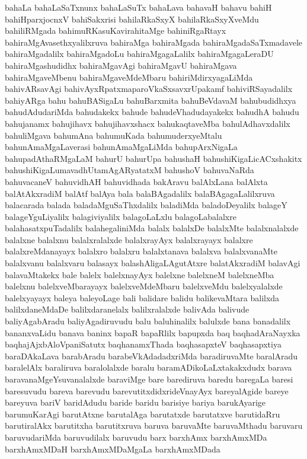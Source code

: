 {bahaLa
bahaLaSaTxnunx
bahaLaSuTx
bahaLava
bahavaH
bahavu
bahiH
bahiHparxjocnxV
bahiSakxrisi
bahilaRkaSxyX
bahilaRkaSxyXveMdu
bahiliRMgada
bahimuRKasuKavirahitaMge
bahiniRgaRtayx
bahiraMgAvasethxyalilxruva
bahiraMga
bahiraMgada
bahiraMgadaSaTxmadavele
bahiraMgadalilx
bahiraMgadoLu
bahiraMgagaLalilx
bahiraMgagaLeraDU
bahiraMgashudidhx
bahiraMgavAgi
bahiraMgavU
bahiraMgava
bahiraMgaveMbenu
bahiraMgaveMdeMbaru
bahiriMdirxyagaLiMda
bahivARsavAgi
bahivAyxRpatxmaparoVkaSxsavxrUpakamf
bahiviRSayadalilx
bahiyARga
bahu
bahuBASigaLu
bahuBarxmita
bahuBeVdavaM
bahubudidhxya
bahudAdudariMda
bahudakekx
bahude
bahudeVhadudayakekx
bahudhA
bahudu
bahujanamx
bahujihavx
bahujihavxshacx
bahukaqtaveMba
bahulAdhavxdalilx
bahuliMgava
bahumAna
bahumuKada
bahumuderxyeMtalu
bahunAmaMgaLaverasi
bahunAmaMgaLiMda
bahupArxNigaLa
bahupadAthaRMgaLaM
bahurU
bahurUpa
bahushaH
bahushiKigaLicACxshakitx
bahushiKigaLumavadhUtamAgARyatatxM
bahushoV
bahuvaNaRda
bahuvacaneV
bahuvidhAH
bahuvidhada
bakAravu
balAlxLana
balAlxta
balAtAkxradiM
balAtf
balAya
bala
balaBAgadalilx
balaBAgagaLalilxruva
balacarada
balada
baladaMguSaThxdalilx
baladiMda
baladoDeyalilx
balageY
balageYguLiyalilx
balagiviyalilx
balagoLaLxlu
balagoLabalalxre
balahasatxpuTadalilx
balahegaliniMda
balalx
balalxDe
balalxMte
balalxnalalxde
balalxne
balalxnu
balalxralalxde
balalxrayAyx
balalxrayayx
balalxre
balalxreMdanayayx
balalxro
balalxru
balalxtanava
balalxva
balalxvanaMte
balalxvanu
balalxvaru
balasayx
balashAligaLAgutAtxre
balatAkxradiM
balavAgi
balavaMtakekx
bale
balelx
balelxnayAyx
balelxne
balelxneM
balelxneMba
balelxnu
balelxveMbarayayx
balelxveMdeMbaru
balelxveMdu
balelxyalalxde
balelxyayayx
baleya
baleyoLage
bali
balidare
balidu
balikevaMtara
balilxda
balilxdaneMdaDe
balilxdaranelalx
balilxralalxde
balivAda
balivude
baliyAgabAradu
baliyAgadiruvudu
balu
baluhinalilx
balulxde
bana
banadalilx
bananxvaLidu
banava
baninx
bapaR
bapaRlilx
bapupxda
baq
baqhadAraNayxka
baqhajAjxbAloVpaniSatutx
baqhanamxThada
baqhasapxteV
baqhasapxtiya
baraDAkaLava
barabAradu
barabeVkAdadadxriMda
baradiruvaMte
baralAradu
baralelAlx
baraliruva
baralolalxde
baralu
baramADikoLaLxtakakxdudx
barava
baravanaMgeYsuvanalalxde
baraviMge
bare
barediruva
baredu
baregaLa
baresi
baresuvudu
bareva
barevudu
barevutitxdidxrideVnayAyx
bareyalAgide
bareye
bareyuva
bariV
baridAdudu
baride
baridu
barisiye
bariya
barukAyarige
barumuKarAgi
barutAtxne
barutalAga
barutatxde
barutatxve
barutidaRru
barutiralAkx
barutitxha
barutitxruva
baruva
baruvaMte
baruvaMthadu
baruvaru
baruvudariMda
baruvudilalx
baruvudu
barx
barxhAmx
barxhAmxMDa
barxhAmxMDaH
barxhAmxMDaMgaLa
barxhAmxMDada
}
